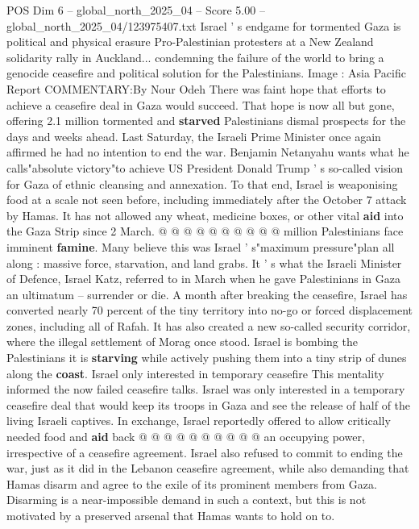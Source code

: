 \begin{textsample}{POS Dim 6 – global\_north\_2025\_04 – Score 5.00 – global\_north\_2025\_04/123975407.txt}  \label{ex:f6_pos_209}
Israel ' s endgame for tormented Gaza is political and physical erasure Pro-Palestinian protesters at a New Zealand solidarity rally in Auckland... condemning the failure of the world to bring a genocide ceasefire and political solution for the Palestinians.
Image : Asia Pacific Report COMMENTARY:By Nour Odeh There was faint hope that efforts to achieve a ceasefire deal in Gaza would succeed.
That hope is now all but gone, offering 2.1 million tormented and \textbf{starved} Palestinians dismal prospects for the days and weeks ahead.
Last Saturday, the Israeli Prime Minister once again affirmed he had no intention to end the war.
Benjamin Netanyahu wants what he calls"absolute victory"to achieve US President Donald Trump ' s so-called vision for Gaza of ethnic cleansing and annexation.
To that end, Israel is weaponising food at a scale not seen before, including immediately after the October 7 attack by Hamas.
It has not allowed any wheat, medicine boxes, or other vital \textbf{aid} into the Gaza Strip since 2 March. @ @ @ @ @ @ @ @ @ @ million Palestinians face imminent \textbf{famine}.
Many believe this was Israel ' s"maximum pressure"plan all along : massive force, starvation, and land grabs.
It ' s what the Israeli Minister of Defence, Israel Katz, referred to in March when he gave Palestinians in Gaza an ultimatum -- surrender or die.
A month after breaking the ceasefire, Israel has converted nearly 70 percent of the tiny territory into no-go or forced displacement zones, including all of Rafah.
It has also created a new so-called security corridor, where the illegal settlement of Morag once stood.
Israel is bombing the Palestinians it is \textbf{starving} while actively pushing them into a tiny strip of dunes along the \textbf{coast}.
Israel only interested in temporary ceasefire This mentality informed the now failed ceasefire talks.
Israel was only interested in a temporary ceasefire deal that would keep its troops in Gaza and see the release of half of the living Israeli captives.
In exchange, Israel reportedly offered to allow critically needed food and \textbf{aid} back @ @ @ @ @ @ @ @ @ @ an occupying power, irrespective of a ceasefire agreement.
Israel also refused to commit to ending the war, just as it did in the Lebanon ceasefire agreement, while also demanding that Hamas disarm and agree to the exile of its prominent members from Gaza.
Disarming is a near-impossible demand in such a context, but this is not motivated by a preserved arsenal that Hamas wants to hold on to.

\end{textsample}
